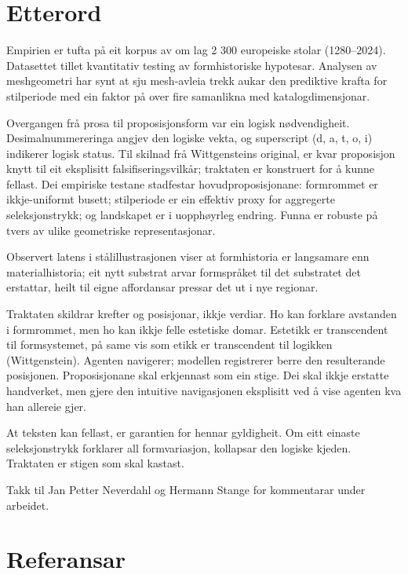 \documentclass[10pt]{article}
\begin{document}
\backmatter
\chapter*{Etterord}

Empirien er tufta på eit korpus av om lag 2 300 europeiske stolar (1280–2024). Datasettet tillet kvantitativ testing av formhistoriske hypotesar. Analysen av meshgeometri har synt at sju mesh-avleia trekk aukar den prediktive krafta for stilperiode med ein faktor på over fire samanlikna med katalogdimensjonar.

Overgangen frå prosa til proposisjonsform var ein logisk nødvendigheit. Desimalnummereringa angjev den logiske vekta, og superscript (d, a, t, o, i) indikerer logisk status. Til skilnad frå Wittgensteins original, er kvar proposisjon knytt til eit eksplisitt falsifiseringsvilkår; traktaten er konstruert for å kunne fellast. Dei empiriske testane stadfestar hovudproposisjonane: formrommet er ikkje-uniformt busett; stilperiode er ein effektiv proxy for aggregerte seleksjonstrykk; og landskapet er i uopphøyrleg endring. Funna er robuste på tvers av ulike geometriske representasjonar.

Observert latens i stålillustrasjonen viser at formhistoria er langsamare enn materialhistoria; eit nytt substrat arvar formspråket til det substratet det erstattar, heilt til eigne affordansar pressar det ut i nye regionar.

Traktaten skildrar krefter og posisjonar, ikkje verdiar. Ho kan forklare avstanden i formrommet, men ho kan ikkje felle estetiske domar. Estetikk er transcendent til formsystemet, på same vis som etikk er transcendent til logikken (Wittgenstein). Agenten navigerer; modellen registrerer berre den resulterande posisjonen. Proposisjonane skal erkjennast som ein stige. Dei skal ikkje erstatte handverket, men gjere den intuitive navigasjonen eksplisitt ved å vise agenten kva han allereie gjer.

At teksten kan fellast, er garantien for hennar gyldigheit. Om eitt einaste seleksjonstrykk forklarer all formvariasjon, kollapsar den logiske kjeden. Traktaten er stigen som skal kastast.

Takk til Jan Petter Neverdahl og Hermann Stange for kommentarar under arbeidet.


\chapter*{Referansar}
\end{document}
